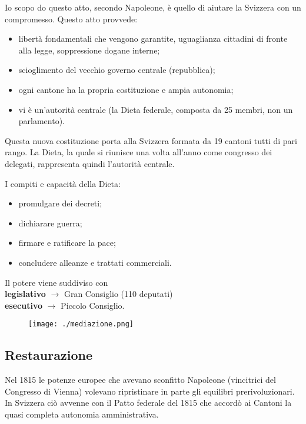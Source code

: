 \documentclass[a4paper]{article}
\begin{document}

Io scopo do questo atto, secondo Napoleone, è quello di aiutare la Svizzera con un compromesso.
Questo atto provvede:
\begin{itemize}
    \item libertà fondamentali che vengono garantite, uguaglianza cittadini di fronte alla legge, soppressione dogane interne;
    \item scioglimento del vecchio governo centrale (repubblica);
    \item ogni cantone ha la propria costituzione e ampia autonomia;
    \item vi è un'autorità centrale (la Dieta federale, composta da 25 membri, non un parlamento).
\end{itemize}

Questa nuova costituzione porta alla Svizzera formata da 19 cantoni tutti di pari rango.
La Dieta, la quale si riunisce una volta all'anno come congresso dei delegati,
rappresenta quindi l'autorità centrale.

I compiti e capacità della Dieta:
\begin{itemize}
    \item promulgare dei decreti;
    \item dichiarare guerra;
    \item firmare e ratificare la pace;
    \item concludere alleanze e trattati commerciali.
\end{itemize}

Il potere viene suddiviso con \\
\textbf{legislativo} \(\rightarrow\) Gran Consiglio (110 deputati) \\
\textbf{esecutivo} \(\rightarrow\) Piccolo Consiglio.

\begin{figure}[h]
    \centering
    \texttt{[image: ./mediazione.png]}
\end{figure}

\subsection{Restaurazione}

Nel 1815 le potenze europee che avevano sconfitto Napoleone (vincitrici del Congresso di Vienna)
volevano ripristinare in parte gli equilibri prerivoluzionari.
In Svizzera ciò avvenne con il Patto federale del 1815 che
accordò ai Cantoni la quasi completa autonomia amministrativa.
\end{document}

